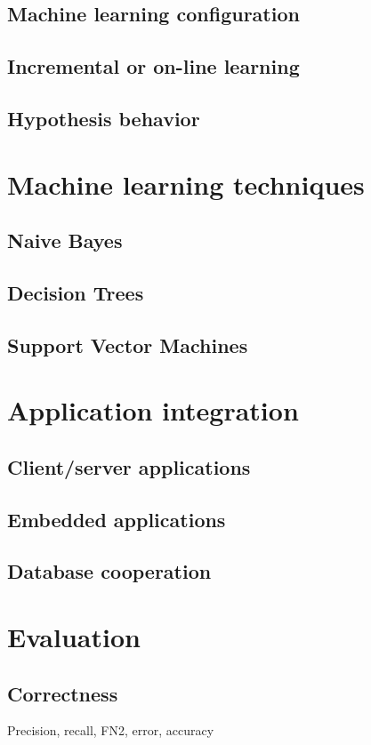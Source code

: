 \documentclass[a4paper]{report}
\begin{document}
\subsection{Machine learning configuration}
\subsection{Incremental or on-line learning}
\subsection{Hypothesis behavior}

\section{Machine learning techniques}
\subsection{Naive Bayes}
\subsection{Decision Trees}
\subsection{Support Vector Machines}

\section{Application integration}
\subsection{Client/server applications}
\subsection{Embedded applications}
\subsection{Database cooperation}

\section{Evaluation}
\subsection{Correctness}
Precision, recall, FN2, error, accuracy
\end{document}
